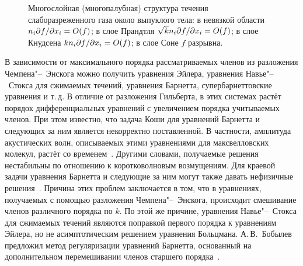 \begin{figure}
    \centering
    \caption[
        Многослойная (многопалубная) структура течения слаборазреженного газа около выпуклого тела.
    ]{
        Многослойная (многопалубная) структура течения слаборазреженного газа около выпуклого тела:
        в невязкой области \(n_i\Pder[f]{x_i}=\OO{f}\);
        в слое Прандтля \(\sqrt{k}n_i\Pder[f]{x_i}=\OO{f}\);
        в слое Кнудсена \(kn_i\Pder[f]{x_i}=\OO{f}\);
        в слое Соне \(f\) разрывна.
    }\label{fig:asymptotic_structure}
\end{figure}

В зависимости от максимального порядка рассматриваемых членов из разложения Чемпена"--~Энскога можно получить
уравнения Эйлера, уравнения Навье"--~Стокса для сжимаемых течений, уравнения Барнетта, супербарнеттовские уравнения и т.\,д.
В отличие от разложения Гильберта, в этих системах растёт порядок дифференциальных уравнений
с увеличением порядка учитываемых членов.
При этом известно, что задача Коши для уравнений Барнетта и следующих за ним является некорректно поставленной.
В частности, амплитуда акустических волн, описываемых этими уравнениями для максвелловских молекул,
растёт со временем~\cite{Bobylev1982}.
Другими словами, получаемые решения нестабильны по отношению к коротковолновым возмущениям.
Для краевой задачи уравнения Барнетта и следующие за ним могут также давать нефизичные решения~\cite{Cercignani1973}.
Причина этих проблем заключается в том, что в уравнениях, получаемых с помощью разложения Чемпена"--~Энскога,
происходит смешивание членов различного порядка по \(k\).
По этой же причине, уравнения Навье"--~Стокса для сжимаемых течений являются поправкой первого порядка к уравнениям Эйлера,
но не асимптотическим решением уравнения Больцмана.
А.\,В.~Бобылев предложил метод регуляризации уравнений Барнетта,
основанный на дополнительном перемешивании членов старшего порядка~\cite{Bobylev2006}.

